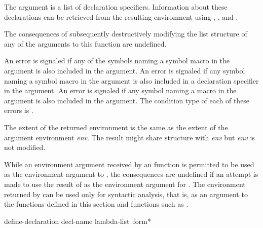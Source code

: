 \begin{newer}
\begin{defun}[Function]
\begin{flushdesc}
\item[\cd{:declare}]
      The argument is a list of declaration specifiers.
      Information about these declarations can
                be retrieved from the resulting environment using
                , , and
                .
\end{flushdesc}
  The consequences of subsequently
  destructively modifying the list
  structure of any of the arguments to this function are undefined.

  An error is signaled if any of the symbols naming a symbol macro in the
   argument is also included in the  argument.
  An error is
  signaled if any symbol naming a symbol macro in the  argument is
  also included in a  declaration specifier in the  argument.
  An error is
  signaled if any symbol naming a macro in the  argument is also included
  in the  argument.
  The condition type of each of these errors is .

  The extent of the returned environment is the same as the extent of the
  argument environment {\it env}.  The result might share structure with {\it env}
  but {\it env} is not modified.

  While an environment argument received by an 
  function is permitted to be used as the
  environment argument to , the consequences are undefined if an
  attempt is made to use the result of  as the environment
  argument for .  The environment
  returned by  can be used only for syntactic analysis, that is,
  as an argument to
  the functions defined in this section and functions such as .
\end{defun}

\begin{defmac}
define-declaration decl-name lambda-list {\,form}*


\end{defmac}
\end{newer}
